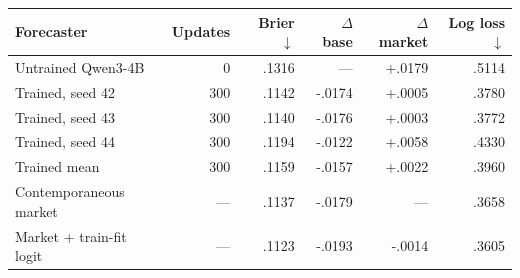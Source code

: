 \begin{tabular}{lrrrrr}
\toprule
Forecaster & Updates & Brier $\downarrow$ & $\Delta$ base & $\Delta$ market & Log loss $\downarrow$ \\
\midrule
Untrained Qwen3-4B       & 0   & .1316 & ---    & +.0179 & .5114 \\
Trained, seed 42         & 300 & .1142 & -.0174 & +.0005 & .3780 \\
Trained, seed 43         & 300 & .1140 & -.0176 & +.0003 & .3772 \\
Trained, seed 44         & 300 & .1194 & -.0122 & +.0058 & .4330 \\
Trained mean             & 300 & .1159 & -.0157 & +.0022 & .3960 \\
\midrule
Contemporaneous market   & --- & .1137 & -.0179 & ---    & .3658 \\
Market + train-fit logit & --- & .1123 & -.0193 & -.0014 & .3605 \\
\bottomrule
\end{tabular}
